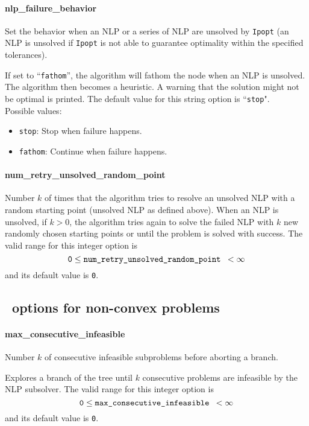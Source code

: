 \paragraph{nlp\_failure\_behavior}
Set the behavior when an NLP or a series of NLP are unsolved by {\tt Ipopt}
(an NLP is unsolved if {\tt Ipopt} is not able to guarantee optimality within the specified tolerances).

 If set to ``{\tt fathom}'', the algorithm will fathom the
node when an NLP is unsolved. The algorithm then becomes a
heuristic. A warning that the solution might not
be optimal is printed.
The default value for this string option is ``{\tt stop}".
\\
Possible values:
\begin{itemize}
   \item {\tt stop}: Stop when failure happens.
   \item {\tt fathom}: Continue when failure happens.
\end{itemize}

\paragraph{num\_retry\_unsolved\_random\_point}
Number $k$ of times that the algorithm tries to resolve an unsolved NLP with a
random starting point (unsolved NLP as defined above).
 When an NLP is unsolved, if $k > 0$, the algorithm tries
again to solve the failed NLP with $k$ new
randomly chosen starting points  or until the
problem is solved with success. The valid range for this integer option is
$${\tt 0} \le \hbox{\tt num\_retry\_unsolved\_random\_point } <  \infty$$
and its default value is {\tt 0}.



\subsection{\Bonmin\ options for non-convex problems}

\paragraph{max\_consecutive\_infeasible}
Number $k$ of consecutive infeasible subproblems before aborting a branch.

 Explores a branch of the tree
      until $k$ consecutive
problems are infeasible by the NLP subsolver. The valid range for
this integer option is
$${\tt 0} \le \hbox{\tt max\_consecutive\_infeasible } <  \infty$$
and its default value is {\tt 0}.


